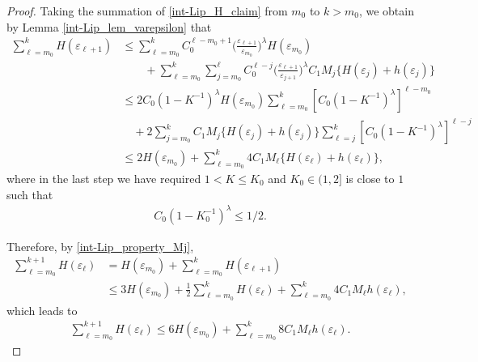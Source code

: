 \documentclass[10pt,a4paper]{amsart}
\begin{document}
\begin{proof}
Taking the summation of \eqref{int-Lip_H_claim} from $m_0$ to $k > m_0$, we obtain by Lemma \ref{int-Lip_lem_varepsilon} that
  \begin{align*}
    \sum_{\ell=m_0}^k H(\varepsilon_{\ell+1}) &\leq \sum_{\ell=m_0}^kC_0^{\ell-m_0+1}\Big(\frac{\varepsilon_{\ell+1}}{\varepsilon_{m_0}}\Big)^\lambda H(\varepsilon_{m_0})\\&\qquad+ \sum_{\ell=m_0}^k\sum_{j=m_0}^{\ell}C_0^{\ell-j}\Big(\frac{\varepsilon_{\ell+1}}{\varepsilon_{j+1}}\Big)^\lambda C_1M_j\{H(\varepsilon_j)+h(\varepsilon_j)\}\\&\leq 2 C_0(1-K^{-1})^{\lambda} H(\varepsilon_{m_0})\sum_{\ell={m_0}}^k[C_0(1-K^{-1})^{\lambda}]^{\ell-m_0}\\&\quad+2 \sum_{j=m_0}^kC_1M_j\{H(\varepsilon_j)+h(\varepsilon_j)\}\sum_{\ell=j}^k[C_0(1-K^{-1})^{\lambda}]^{\ell-j}\\&\leq 2H(\varepsilon_{m_0})+\sum_{\ell=m_0}^k 4C_1M_\ell\{H(\varepsilon_\ell)+h(\varepsilon_\ell)\},
  \end{align*}
  where in the last step we have required $1 < K \leq K_0$ and $K_0 \in (1,2]$ is close to $1$ such that
\begin{align}\label{int-Lip_cond_K0}
  C_0(1-K_0^{-1})^{\lambda}\le 1/2.
\end{align}

Therefore, by \eqref{int-Lip_property_Mj},
\begin{align*}
    \sum_{\ell=m_0}^{k+1}H(\varepsilon_{\ell}) & = H(\varepsilon_{m_0}) + \sum_{\ell=m_0}^{k}H(\varepsilon_{\ell+1})\\
    & \leq 3H(\varepsilon_{m_0})+\frac{1}{2} \sum_{\ell = {m_0}}^k H(\varepsilon_\ell) + \sum_{\ell = m_0}^k 4C_1M_\ell h(\varepsilon_\ell),
\end{align*}
which leads to
\begin{align}\label{int-Lip_es_H}
  \sum_{\ell = m_0}^{k+1}H(\varepsilon_{\ell})\leq 6H(\varepsilon_{m_0})+\sum_{\ell = m_0}^k8C_1M_\ell h(\varepsilon_\ell).
\end{align}


\end{proof}
\end{document}
